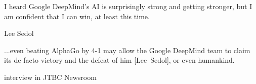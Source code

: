 \documentclass{beamer}
\begin{document}
  {
    \begin{frame}[standout]
      \epigraph{
        \tiny
        I heard Google DeepMind's AI is surprisingly strong and getting stronger, but I am confident that I can win, at least this time.
      }{Lee Sedol}
      \pause

      \epigraph{
        \tiny
        ...even beating AlphaGo by 4-1 may allow the Google DeepMind team to claim its de facto victory and the defeat of him [Lee~Sedol], or even humankind.
      }{interview in JTBC Newsroom}
      \pause
    \end{frame}
  }
\end{document}
